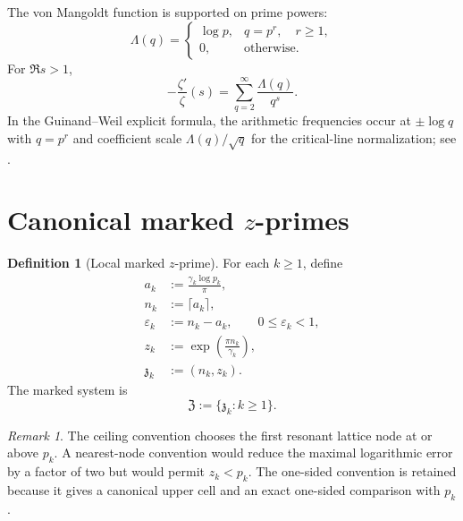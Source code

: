\documentclass[11pt]{amsart}
\numberwithin{equation}{section}
\theoremstyle{plain}
\theoremstyle{definition}
\newtheorem{definition}[theorem]{Definition}
\theoremstyle{remark}
\newtheorem{remark}[theorem]{Remark}
\newcommand{\ZP}{\mathfrak Z}
\begin{document}
The von Mangoldt function is supported on prime powers:
\begin{equation}
 \Lambda(q)=
 \begin{cases}
 \log p,&q=p^r,\quad r\geq1,\\
 0,&\text{otherwise}.
 \end{cases}
 \label{eq:mangoldt_definition}
\end{equation}
For $\Re s>1$,
\begin{equation}
 -\frac{\zeta'}{\zeta}(s)
 =\sum_{q=2}^{\infty}\frac{\Lambda(q)}{q^s}.
 \label{eq:log_derivative_dirichlet_series}
\end{equation}
In the Guinand--Weil explicit formula, the arithmetic frequencies occur at
$\pm\log q$ with $q=p^r$ and coefficient scale
$\Lambda(q)/\sqrt q$ for the critical-line normalization; see
\cite{Guinand1948,Weil1952}.

\section{Canonical marked $z$-primes}
\label{sec:canonical_definition}

\begin{definition}[Local marked $z$-prime]
\label{def:local_marked_zprime}
For each $k\geq1$, define
\begin{align}
 a_k
 &:=\frac{\gamma_k\log p_k}{\pi},
 \label{eq:ak_definition}
 \\
 n_k
 &:=\lceil a_k\rceil,
 \label{eq:nk_definition}
 \\
 \varepsilon_k
 &:=n_k-a_k,
 \qquad 0\leq\varepsilon_k<1,
 \label{eq:epsilon_definition}
 \\
 z_k
 &:=\exp\left(\frac{\pi n_k}{\gamma_k}\right),
 \label{eq:zk_definition}
 \\
 \mathfrak z_k
 &:=(n_k,z_k).
 \label{eq:marked_zprime_definition}
\end{align}
The marked system is
\begin{equation}
 \ZP:=\{\mathfrak z_k:k\geq1\}.
 \label{eq:marked_system_definition}
\end{equation}
\end{definition}

\begin{remark}
\label{rem:ceiling_choice}
The ceiling convention chooses the first resonant lattice node at or above
$p_k$.  A nearest-node convention would reduce the maximal logarithmic error
by a factor of two but would permit $z_k<p_k$.  The one-sided convention is
retained because it gives a canonical upper cell and an exact one-sided
comparison with $p_k$.
\end{remark}
\end{document}
